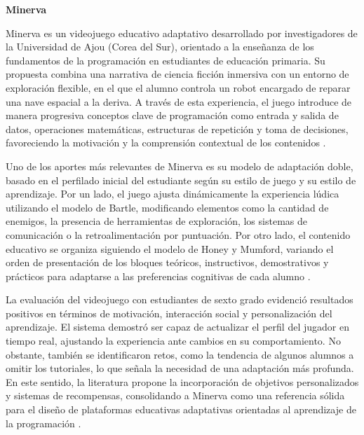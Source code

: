 \textbf{Minerva}

Minerva es un videojuego educativo adaptativo desarrollado por investigadores de la Universidad de Ajou (Corea del Sur), orientado a la enseñanza de los fundamentos de la programación en estudiantes de educación primaria. Su propuesta combina una narrativa de ciencia ficción inmersiva con un entorno de exploración flexible, en el que el alumno controla un robot encargado de reparar una nave espacial a la deriva. A través de esta experiencia, el juego introduce de manera progresiva conceptos clave de programación como entrada y salida de datos, operaciones matemáticas, estructuras de repetición y toma de decisiones, favoreciendo la motivación y la comprensión contextual de los contenidos \cite{lindberg2017improving}.

Uno de los aportes más relevantes de Minerva es su modelo de adaptación doble, basado en el perfilado inicial del estudiante según su estilo de juego y su estilo de aprendizaje. Por un lado, el juego ajusta dinámicamente la experiencia lúdica utilizando el modelo de Bartle, modificando elementos como la cantidad de enemigos, la presencia de herramientas de exploración, los sistemas de comunicación o la retroalimentación por puntuación. Por otro lado, el contenido educativo se organiza siguiendo el modelo de Honey y Mumford, variando el orden de presentación de los bloques teóricos, instructivos, demostrativos y prácticos para adaptarse a las preferencias cognitivas de cada alumno \cite{lindberg2017improving}.

La evaluación del videojuego con estudiantes de sexto grado evidenció resultados positivos en términos de motivación, interacción social y personalización del aprendizaje. El sistema demostró ser capaz de actualizar el perfil del jugador en tiempo real, ajustando la experiencia ante cambios en su comportamiento. No obstante, también se identificaron retos, como la tendencia de algunos alumnos a omitir los tutoriales, lo que señala la necesidad de una adaptación más profunda. En este sentido, la literatura propone la incorporación de objetivos personalizados y sistemas de recompensas, consolidando a Minerva como una referencia sólida para el diseño de plataformas educativas adaptativas orientadas al aprendizaje de la programación \cite{lindberg2017improving}.

